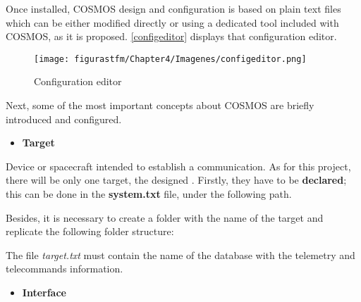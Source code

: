 Once installed, COSMOS design and configuration is based on plain text files which can be either modified directly or using a dedicated tool included with COSMOS, as it is proposed. \autoref{configeditor} displays that configuration editor.


\begin{figure} [H]
			\centering
			\texttt{[image: figurastfm/Chapter4/Imagenes/configeditor.png]}
			\caption{Configuration editor} \label{configeditor}
			\vspace{-1cm}
\end{figure}

Next, some of the most important concepts about COSMOS are briefly introduced and configured. \newpage

\begin{itemize} [noitemsep,topsep=0pt]
	\item \textbf{Target} 
\end{itemize}

	Device or spacecraft intended to establish a communication. As for this project, there will be only one target, the designed . Firstly, they have to be \textbf{declared}; this can be done in the \textbf{system.txt} file, under the following path.

	
	\begin{figure} [H]
\centering
\begin{minipage}{5cm}
\end{minipage}
\end{figure}



Besides, it is necessary to create a folder with the name of the target and replicate the following folder structure:

	\begin{figure} [H]
\centering
\begin{minipage}{5cm}
\end{minipage}
\end{figure}

The file \textit{target.txt} must contain the name of the database with the telemetry and telecommands information.


\begin{itemize} [noitemsep,topsep=0pt]
	\item \textbf{Interface}
\end{itemize}

